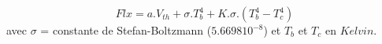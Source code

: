 \[
Flx =  a.V_{th} + \sigma.T_b^4 + K.\sigma.(T_b^4 - T_c^4)
\]
avec $\sigma$ = constante de Stefan-Boltzmann ($5.6698 10^{-8}$) et $T_b$ et $T_c$ en $Kelvin$.
